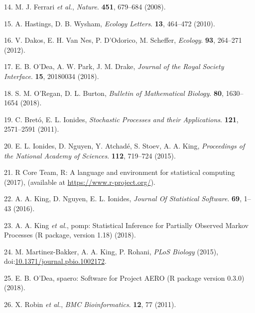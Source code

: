 \documentclass[3p]{elsarticle} %
\begin{document}
\leavevmode\hypertarget{ref-Ferrari2008}{}%
14. M. J. Ferrari \emph{et al.}, \emph{Nature}. \textbf{451}, 679--684
(2008).

\leavevmode\hypertarget{ref-Hastings2010}{}%
15. A. Hastings, D. B. Wysham, \emph{Ecology Letters}. \textbf{13},
464--472 (2010).

\leavevmode\hypertarget{ref-Dakos2012a}{}%
16. V. Dakos, E. H. Van Nes, P. D'Odorico, M. Scheffer, \emph{Ecology}.
\textbf{93}, 264--271 (2012).

\leavevmode\hypertarget{ref-ODea2018a}{}%
17. E. B. O'Dea, A. W. Park, J. M. Drake, \emph{Journal of the Royal
Society Interface}. \textbf{15}, 20180034 (2018).

\leavevmode\hypertarget{ref-ORegan2018}{}%
18. S. M. O'Regan, D. L. Burton, \emph{Bulletin of Mathematical
Biology}. \textbf{80}, 1630--1654 (2018).

\leavevmode\hypertarget{ref-Breto2011}{}%
19. C. Bretó, E. L. Ionides, \emph{Stochastic Processes and their
Applications}. \textbf{121}, 2571--2591 (2011).

\leavevmode\hypertarget{ref-Ionides2015}{}%
20. E. L. Ionides, D. Nguyen, Y. Atchadé, S. Stoev, A. A. King,
\emph{Proceedings of the National Academy of Sciences}. \textbf{112},
719--724 (2015).

\leavevmode\hypertarget{ref-R2017}{}%
21. R Core Team, R: A language and environment for statistical computing
(2017), (available at \url{https://www.r-project.org/}).

\leavevmode\hypertarget{ref-King2016}{}%
22. A. A. King, D. Nguyen, E. L. Ionides, \emph{Journal Of Statistical
Software}. \textbf{69}, 1--43 (2016).

\leavevmode\hypertarget{ref-King2018}{}%
23. A. A. King \emph{et al.}, pomp: Statistical Inference for Partially
Observed Markov Processes (R package, version 1.18) (2018).

\leavevmode\hypertarget{ref-Martinez-Bakker2015}{}%
24. M. Martinez-Bakker, A. A. King, P. Rohani, \emph{PLoS Biology}
(2015),
doi:\href{https://doi.org/10.1371/journal.pbio.1002172}{10.1371/journal.pbio.1002172}.

\leavevmode\hypertarget{ref-ODea2018}{}%
25. E. B. O'Dea, spaero: Software for Project AERO (R package version
0.3.0) (2018).

\leavevmode\hypertarget{ref-Robin2011}{}%
26. X. Robin \emph{et al.}, \emph{BMC Bioinformatics}. \textbf{12}, 77
(2011).
\end{document}
